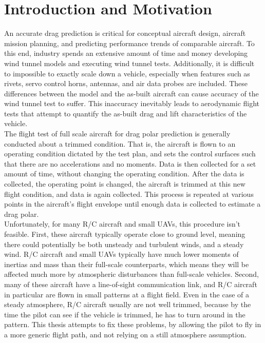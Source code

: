 \chapter{Introduction and Motivation}
\label{intro}
An accurate drag prediction is critical for conceptual aircraft design, aircraft mission planning, and predicting performance trends of comparable aircraft. To this end, industry spends an extensive amount of time and money developing wind tunnel models and executing wind tunnel tests. 
Additionally, it is difficult to impossible to exactly scale down a vehicle, especially when features such as rivets, servo control horns, antennas, and air data probes are included. These differences between the model and the as-built aircraft can cause accuracy of the wind tunnel test to suffer. This inaccuracy 
inevitably leads to aerodynamic flight tests that attempt to quantify the as-built drag and lift characteristics of the vehicle.
\\
The flight test of full scale aircraft for drag polar prediction is generally conducted about a trimmed condition. That is, the aircraft is flown to an operating condition dictated by the test plan, and sets the control surfaces such that there are no accelerations and no moments. Data is then collected for a set amount of time, without changing the operating condition. After the data is collected, the operating point is changed, the aircraft is trimmed at this new flight condition, and data is again collected. This process is repeated at various points in the aircraft's flight envelope until enough data is collected to estimate a drag polar.\\
Unfortunately, for many R/C aircraft and small UAVs, this procedure isn't feasible. First, these aircraft typically operate close to ground level, meaning there could potentially be both unsteady and turbulent winds, and a steady wind. R/C aircraft and small UAVs typically have much lower moments of inertias and mass than their full-scale counterparts, which means they will be affected much more by atmospheric disturbances than full-scale vehicles. Second, many of these aircraft have a line-of-sight communication link, and R/C aircraft in particular are flown in small patterns at a flight field. Even in the case of a steady atmosphere, R/C aircraft usually are not well trimmed, because by the time the pilot can see if the vehicle is trimmed, he has to turn around in the pattern. This thesis attempts to fix these problems, by allowing the pilot to fly in a more generic flight path, and not relying on a still atmosphere assumption.

